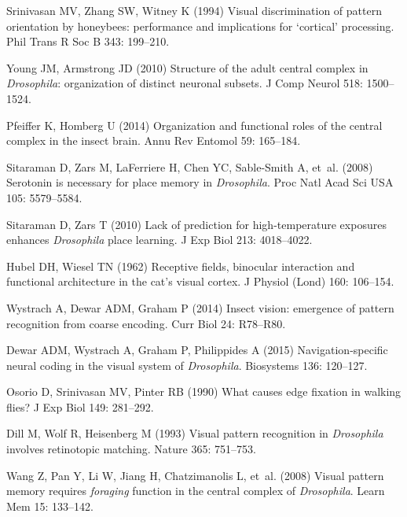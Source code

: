 \begin{thebibliography}{10}
	Srinivasan MV, Zhang SW, Witney K (1994) Visual discrimination of pattern
	orientation by honeybees: performance and implications for `cortical'
	processing.
	\newblock Phil Trans R Soc B 343: 199--210.
	
	Young JM, Armstrong JD (2010) Structure of the adult central complex in
	\emph{Drosophila}: organization of distinct neuronal subsets.
	\newblock J Comp Neurol 518: 1500--1524.
	
	Pfeiffer K, Homberg U (2014) Organization and functional roles of the central
	complex in the insect brain.
	\newblock Annu Rev Entomol 59: 165--184.
	
	Sitaraman D, Zars M, LaFerriere H, Chen YC, Sable-Smith A, et~al. (2008)
	Serotonin is necessary for place memory in \emph{Drosophila}.
	\newblock Proc Natl Acad Sci USA 105: 5579--5584.
	
	Sitaraman D, Zars T (2010) Lack of prediction for high-temperature exposures
	enhances \emph{Drosophila} place learning.
	\newblock J Exp Biol 213: 4018--4022.
	
	Hubel DH, Wiesel TN (1962) Receptive fields, binocular interaction and
	functional architecture in the cat's visual cortex.
	\newblock J Physiol (Lond) 160: 106--154.
	
	Wystrach A, Dewar ADM, Graham P (2014) Insect vision: emergence of pattern
	recognition from coarse encoding.
	\newblock Curr Biol 24: R78--R80.
	
	Dewar ADM, Wystrach A, Graham P, Philippides A (2015) Navigation-specific
	neural coding in the visual system of \emph{Drosophila}.
	\newblock Biosystems 136: 120--127.
	
	Osorio D, Srinivasan MV, Pinter RB (1990) What causes edge fixation in walking
	flies?
	\newblock J Exp Biol 149: 281--292.
	
	Dill M, Wolf R, Heisenberg M (1993) Visual pattern recognition in
	\emph{Drosophila} involves retinotopic matching.
	\newblock Nature 365: 751--753.
	
	Wang Z, Pan Y, Li W, Jiang H, Chatzimanolis L, et~al. (2008) Visual pattern
	memory requires \emph{foraging} function in the central complex of
	\emph{Drosophila}.
	\newblock Learn Mem 15: 133--142.
	

\end{thebibliography}
